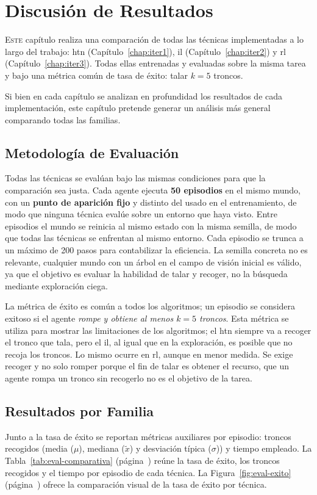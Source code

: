 \chapter{Discusión de Resultados}
\label{chap:discusion-resultados}

\lettrine{E}{ste} capítulo realiza una comparación de todas las
técnicas implementadas a lo largo del trabajo:
\gls{htn} (Capítulo~\ref{chap:iter1}), \gls{il}
(Capítulo~\ref{chap:iter2}) y \gls{rl} (Capítulo~\ref{chap:iter3}).
Todas ellas entrenadas y evaluadas sobre la misma tarea y bajo una métrica común 
de tasa de éxito: talar $k=\num{5}$ troncos. 

Si bien en cada capítulo se analizan en profundidad los resultados de cada implementación, 
este capítulo pretende generar un análisis más general comparando todas las familias. 

\section{Metodología de Evaluación}
\label{sec:eval-metodologia}
Todas las técnicas se evalúan bajo las mismas condiciones para que la comparación sea justa.
Cada agente ejecuta \textbf{\num{50} episodios} en el mismo mundo, con un \textbf{punto de
aparición fijo} y distinto del usado en el entrenamiento, de modo que ninguna
técnica evalúe sobre un entorno que haya visto. Entre episodios el mundo se reinicia al mismo
estado con la misma \gls{semilla}, de modo que todas las técnicas se enfrentan al mismo entorno.
Cada episodio se trunca a un máximo de \num{200} pasos para contabilizar la eficiencia.
La semilla concreta no es relevante, cualquier mundo con un árbol en el campo de visión inicial es válido, ya que el objetivo es evaluar la habilidad de talar y recoger, no la búsqueda mediante exploración ciega.

La métrica de éxito es común a todos los algoritmos; un episodio se considera exitoso
si el agente \emph{rompe y obtiene al menos $k=\num{5}$ troncos}. Esta métrica se utiliza para mostrar las limitaciones 
de los algoritmos; el \gls{htn} siempre va a recoger el tronco que tala, pero el \gls{il}, al igual que en la
exploración, es posible que no recoja los troncos. Lo mismo ocurre en \gls{rl}, aunque en menor medida. Se exige recoger y no solo romper porque el fin de talar es obtener el recurso, que un agente rompa un tronco sin recogerlo no es el objetivo de la tarea.

\section{Resultados por Familia}
\label{sec:eval-familias}
Junto a la tasa de éxito se reportan métricas auxiliares por episodio: troncos recogidos 
(media ($\mu$), mediana ($\tilde{x}$) y desviación típica ($\sigma$)) y tiempo empleado.
La Tabla~\ref{tab:eval-comparativa} (página~\pageref{tab:eval-comparativa}) reúne la tasa de éxito, los troncos recogidos y el tiempo
por episodio de cada técnica. La Figura~\ref{fig:eval-exito} (página~\pageref{fig:eval-exito})
ofrece la comparación visual de la tasa de éxito por técnica.


